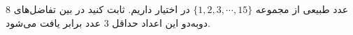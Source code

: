 \EXERCISE
$8$
عدد طبیعی از مجموعه
$\{1, 2, 3, \cdots, 15\}$
در اختیار داریم. ثابت کنید در بین تفاضل‌های دوبه‌دو این اعداد حداقل
$3$
عدد برابر یافت می‌شود.